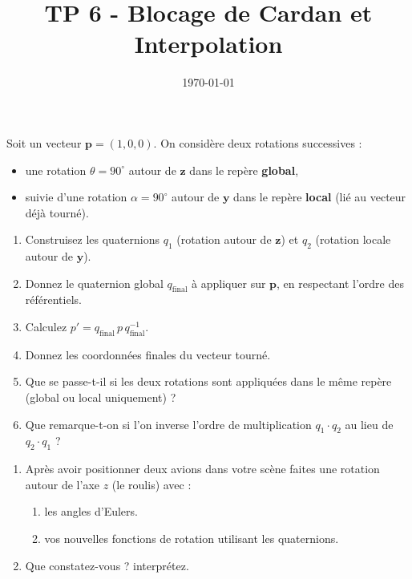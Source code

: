 \documentclass[a4paper,12pt]{article}
\title{TP 6 - Blocage de Cardan et Interpolation}
\author{}
\date{\today}
\begin{document}
\makeonlytitle



Soit un vecteur \( \mathbf{p} = (1, 0, 0) \). On considère deux rotations successives :
\begin{itemize}
  \item une rotation \( \theta = 90^\circ \) autour de \( \mathbf{z} \) dans le repère \textbf{global},
  \item suivie d’une rotation \( \alpha = 90^\circ \) autour de \( \mathbf{y} \) dans le repère \textbf{local} (lié au vecteur déjà tourné).
\end{itemize}

\begin{enumerate}
          \item Construisez les quaternions \( q_1 \) (rotation autour de \( \mathbf{z} \)) et \( q_2 \) (rotation locale autour de \( \mathbf{y} \)).
          \item Donnez le quaternion global \( q_{\text{final}} \) à appliquer sur \( \mathbf{p} \), en respectant l’ordre des référentiels.
          \item Calculez \( p' = q_{\text{final}}\,p\,q_{\text{final}}^{-1} \).
          \item Donnez les coordonnées finales du vecteur tourné.
          \item Que se passe-t-il si les deux rotations sont appliquées dans le même repère (global ou local uniquement) ?
          \item Que remarque-t-on si l’on inverse l’ordre de multiplication \( q_1 \cdot q_2 \) au lieu de \( q_2 \cdot q_1 \) ?
\end{enumerate}

\label{exo:impl}

\begin{enumerate}
	\item Après avoir positionner deux avions dans votre scène faites une rotation autour de l'axe $z$ (le roulis) avec :
    \begin{enumerate}
        \item les angles d'Eulers.
        \item vos nouvelles fonctions de rotation utilisant les quaternions.        
    \end{enumerate}
    \item Que constatez-vous ? interprétez.
\end{enumerate}
\end{document}
